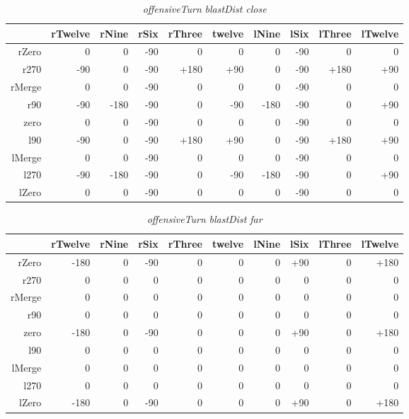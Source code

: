 \begin{table}[H]
\centering
\caption{\emph{offensiveTurn} \emph{blastDist close}}
\begin{tabular}{r|r|r|r|r|r|r|r|r|r}
 		& rTwelve 	& rNine 	& rSix 		& rThree 		& twelve 	& lNine 	& lSix 		& lThree	& lTwelve		\\ \hline
rZero	& 0			& 0			& -90		& 0 		 	& 0			& 0			& -90	 	& 0			& 0				\\
r270	& -90		& 0			& -90		& +180			& +90		& 0			& -90		& +180		& +90			\\
rMerge	& 0			& 0			& -90	 	& 0				& 0			& 0			& -90		& 0			& 0				\\
r90		& -90		& -180		& -90 		& 0				& -90		& -180		& -90		& 0			& +90			\\
zero 	& 0			& 0 		& -90 		& 0				& 0			& 0			& -90		& 0			& 0				\\
l90 	& -90		& 0 		& -90		& +180			& +90		& 0			& -90		& +180		& +90			\\
lMerge	& 0			& 0 		& -90 		& 0				& 0			& 0			& -90		& 0			& 0				\\
l270 	& -90		& -180 		& -90		& 0				& -90		& -180		& -90		& 0			& +90			\\
lZero 	& 0			& 0 		& -90	 	& 0				& 0			& 0  		& -90		& 0			& 0				
\end{tabular}
\end{table}

\begin{table}[H]
\centering
\caption{\emph{offensiveTurn} \emph{blastDist far}}
\begin{tabular}{r|r|r|r|r|r|r|r|r|r}
 		& rTwelve 	& rNine 	& rSix 		& rThree 	& twelve 	& lNine 	& lSix 		& lThree	& lTwelve	\\ \hline
rZero	& -180		& 0			& -90		& 0 	 	& 0			& 0			& +90		& 0			& +180		\\
r270	& 0			& 0			& 0			& 0			& 0			& 0			& 0			& 0			& 0			\\
rMerge	& 0			& 0			& 0	 		& 0			& 0			& 0			& 0			& 0			& 0			\\
r90		& 0			& 0			& 0 		& 0			& 0			& 0			& 0			& 0			& 0			\\
zero 	& -180		& 0 		& -90 		& 0			& 0			& 0			& +90		& 0			& +180		\\
l90 	& 0			& 0 		& 0			& 0			& 0			& 0			& 0			& 0			& 0			\\
lMerge	& 0			& 0 		& 0	 		& 0			& 0			& 0			& 0			& 0			& 0			\\
l270 	& 0			& 0	 		& 0 		& 0			& 0			& 0			& 0			& 0			& 0			\\
lZero 	& -180		& 0 		& -90 		& 0			& 0			& 0  		& +90		& 0			& +180		
\end{tabular}
\end{table}

